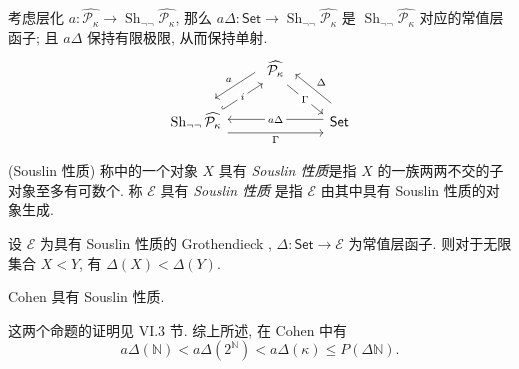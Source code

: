 考虑层化 $a\colon \widehat {\mathcal P_\kappa} \to \operatorname{Sh}_{\neg\neg}\widehat {\mathcal P_\kappa}$, 那么 $a\Delta\colon \mathsf {Set}\to \operatorname{Sh}_{\neg\neg}\widehat {\mathcal P_\kappa}$ 是\topos{} $\operatorname{Sh}_{\neg\neg}\widehat {\mathcal P_\kappa}$ 对应的常值层函子; 且 $a\Delta$ 保持有限极限, 从而保持单射.
\[\begin{tikzcd}[ampersand replacement=\&]
	\& {\widehat {\mathcal P_\kappa}} \\
	{\operatorname{Sh}_{\neg\neg}\widehat {\mathcal P_\kappa}} \&\& {\mathsf {Set}}
	\arrow["a"', shift right=3, from=1-2, to=2-1]
	\arrow["\Gamma"{description}, shift right, from=1-2, to=2-3]
	\arrow["i"{description}, shift right, hook, from=2-1, to=1-2]
	\arrow["\Gamma"', shift right=3, from=2-1, to=2-3]
	\arrow["\Delta"', shift right=3, from=2-3, to=1-2]
	\arrow["{a\Delta}"{description}, shift right, from=2-3, to=2-1]
\end{tikzcd}\]

\begin{definition}
	{(Souslin 性质)}
	称\topos{}中的一个对象 $X$ 具有 \emph{Souslin 性质}是指 $X$ 的一族两两不交的子对象至多有可数个.
	称\topos{} $\mathcal E$ 具有 \emph{Souslin 性质} 是指 $\mathcal E$ 由其中具有 Souslin 性质的对象生成.
\end{definition}

\begin{prop}
	{}
	设 $\mathcal E$ 为具有 Souslin 性质的 Grothendieck \topos{}, $\Delta\colon \mathsf {Set}\to\mathcal E$ 为常值层函子. 则对于无限集合 $X<Y$, 有 $\Delta(X)<\Delta(Y)$.
\end{prop}
%	

\begin{prop}
	{}
	Cohen \topos{}具有 Souslin 性质.
\end{prop}

这两个命题的证明见 \cite{SGL} VI.3 节. 综上所述, 在 Cohen \topos{}中有
$$
a\Delta(\mathbb{N})<a\Delta(2^\mathbb{N})<a\Delta(\kappa)\leq P(\Delta\mathbb{N}).
$$